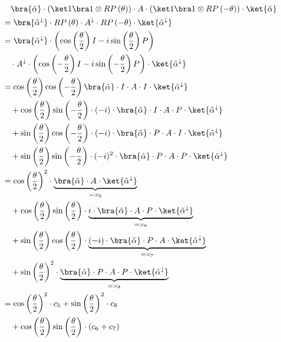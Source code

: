\begin{equation}
    \label{eq:single-prob-simplification3}
    \begin{split}
            &\quad \bra{\tilde\alpha} \cdot (\ket 1 \bra 1 \otimes RP\left(\theta\right)) \cdot A \cdot (\ket 1 \bra 1 \otimes RP\left(-\theta\right)) \cdot \ket{\tilde\alpha} \\
            &= \bra{\tilde\alpha^\downarrow} \cdot RP\left(\theta\right) \cdot A^\downarrow \cdot RP\left(-\theta\right) \cdot \ket{\tilde\alpha^\downarrow} \\
            &= \bra{\tilde\alpha^\downarrow} \cdot \left(\cos\left(\frac\theta2\right) I - i \sin\left(\frac\theta2\right) P\right) \\
                &\quad\cdot A^\downarrow \cdot \left(\cos\left(-\frac\theta2\right) I - i \sin\left(-\frac\theta2\right) P\right) \cdot \ket{\tilde\alpha^\downarrow} \\
            &= \cos\left(\frac\theta2\right)\cos\left(-\frac\theta2\right) \bra{\tilde\alpha} \cdot I \cdot A \cdot I \cdot \ket{\tilde\alpha^\downarrow} \\
                &\quad + \cos\left(\frac\theta2\right)\sin\left(-\frac\theta2\right) \cdot (-i) \cdot \bra{\tilde\alpha} \cdot I \cdot A \cdot P \cdot \ket{\tilde\alpha^\downarrow}  \\
                &\quad + \sin\left(\frac\theta2\right)\cos\left(-\frac\theta2\right) \cdot (-i) \cdot \bra{\tilde\alpha} \cdot P \cdot A \cdot I \cdot \ket{\tilde\alpha^\downarrow} \\
                &\quad + \sin\left(\frac\theta2\right)\sin\left(-\frac\theta2\right) \cdot (-i)^2 \cdot \bra{\tilde\alpha} \cdot P \cdot A \cdot P \cdot \ket{\tilde\alpha^\downarrow} \\
            &= \cos\left(\frac\theta2\right)^2 \cdot \underbrace{\bra{\tilde\alpha} \cdot A \cdot \ket{\tilde\alpha^\downarrow}}_{=: c_5} \\
                &\quad + \cos\left(\frac\theta2\right)\sin\left(\frac\theta2\right) \cdot \underbrace{i \cdot \bra{\tilde\alpha} \cdot A \cdot P \cdot \ket{\tilde\alpha^\downarrow}}_{=: c_6} \\
                &\quad + \sin\left(\frac\theta2\right)\cos\left(\frac\theta2\right) \cdot \underbrace{(-i) \cdot \bra{\tilde\alpha} \cdot P \cdot A \cdot \ket{\tilde\alpha^\downarrow}}_{=: c_7} \\
                &\quad + \sin\left(\frac\theta2\right)^2 \cdot \underbrace{\bra{\tilde\alpha} \cdot P \cdot A \cdot P \cdot \ket{\tilde\alpha^\downarrow}}_{=: c_8} \\
            &= \cos\left(\frac\theta2\right)^2 \cdot c_5 + \sin\left(\frac\theta2\right)^2 \cdot c_8 \\
                &\quad + \cos\left(\frac\theta2\right)\sin\left(\frac\theta2\right) \cdot \left(c_6 + c_7\right)
    \end{split}
\end{equation}

